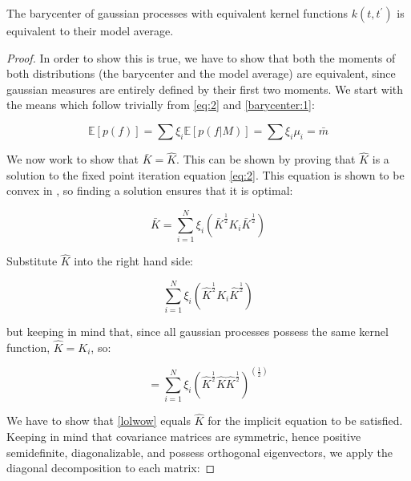 \documentclass[12pt]{article}
\begin{document}
\begin{proposition} \label{prop:1}
    The barycenter of gaussian processes with equivalent kernel functions $k(t, t^{\prime})$
    is equivalent to their model average.
\end{proposition}

\begin{proof}
    In order to show this is true, we have to show that both the moments of both
    distributions (the barycenter and the model average) are equivalent, since gaussian
    measures are entirely defined by their first two moments. We start with the
    means which follow trivially from \ref{eq:2} and \ref{barycenter:1}:

    \begin{equation}
        \mathbb{E}[p(f)] = \sum \xi_i \mathbb{E}[p(f | M)] = \sum \xi_i \mu_i = \bar{m}
    \end{equation}

    We now work to show that $\bar{K} = \hat{K}$. This can be shown by proving that
    $\hat{K}$ is a solution to the fixed point iteration equation \ref{eq:2}. This
    equation is shown to be convex in \cite{NIPS2017_7149}, so finding a solution
    ensures that it is optimal:

    \begin{equation} \label{OTkern}
        \bar{K} = \sum_{i=1}^{N} \xi_i (\bar{K}^{\frac{1}{2}} K_i \bar{K}^{\frac{1}{2}})
    \end{equation}

    Substitute $\hat{K}$ into the right hand side:

    \begin{equation}
        \sum_{i=1}^{N} \xi_i (\hat{K}^{\frac{1}{2}} K_i \hat{K}^{\frac{1}{2}})
    \end{equation}

    but keeping in mind that, since all gaussian processes possess the same kernel
    function, $\hat{K} = K_i$, so:

    \begin{equation} \label{lolwow}
        = \sum_{i=1}^{N} \xi_i (\hat{K}^{\frac{1}{2}} \hat{K} \hat{K}^{\frac{1}{2}})^(\frac{1}{2})
    \end{equation}

    We have to show that \ref{lolwow} equals $\hat{K}$ for the implicit equation
    to be satisfied. Keeping in mind that covariance matrices are symmetric, hence
    positive semidefinite, diagonalizable, and possess orthogonal eigenvectors, we apply
    the diagonal decomposition to each matrix:


\end{proof}
\end{document}

